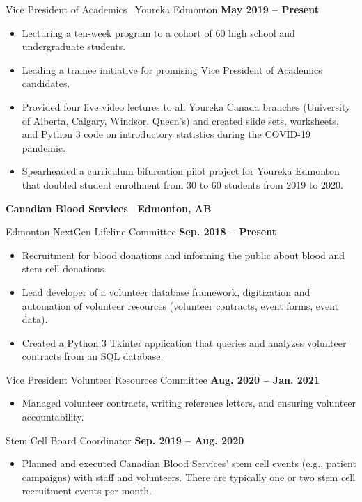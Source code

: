 \documentclass{article}
\begin{document}
    Vice President of Academics \textbar\ Youreka Edmonton \hfill \textbf{May 2019 -- Present}
    \begin{itemize}
        \item Lecturing a ten-week program to a cohort of 60 high school and undergraduate students.
        \item Leading a trainee initiative for promising Vice President of Academics candidates.
        \item Provided four live video lectures to all Youreka Canada branches (University of Alberta, Calgary, Windsor, Queen's) and created slide sets, worksheets, and Python 3 code on introductory statistics during the COVID-19 pandemic.
        \item Spearheaded a curriculum bifurcation pilot project for Youreka Edmonton that doubled student enrollment from 30 to 60 students from 2019 to 2020.
    \end{itemize}

    \textbf{Canadian Blood Services \textbar\ Edmonton, AB}

    Edmonton NextGen Lifeline Committee \hfill \textbf{Sep. 2018 -- Present}
    \begin{itemize}
        \item Recruitment for blood donations and informing the public about blood and stem cell donations.
        \item Lead developer of a volunteer database framework, digitization and automation of volunteer resources (volunteer contracts, event forms, event data).
        \item Created a Python 3 Tkinter application that queries and analyzes volunteer contracts from an SQL database.
    \end{itemize}

    Vice President Volunteer Resources Committee \hfill \textbf{Aug. 2020 -- Jan. 2021}
    \begin{itemize}
        \item Managed volunteer contracts, writing reference letters, and ensuring volunteer accountability.
    \end{itemize}

    Stem Cell Board Coordinator \hfill \textbf{Sep. 2019 -- Aug. 2020}
    \begin{itemize}
        \item Planned and executed Canadian Blood Services' stem cell events (e.g., patient campaigns) with staff and volunteers. There are typically one or two stem cell recruitment events per month.
    \end{itemize}
\end{document}
